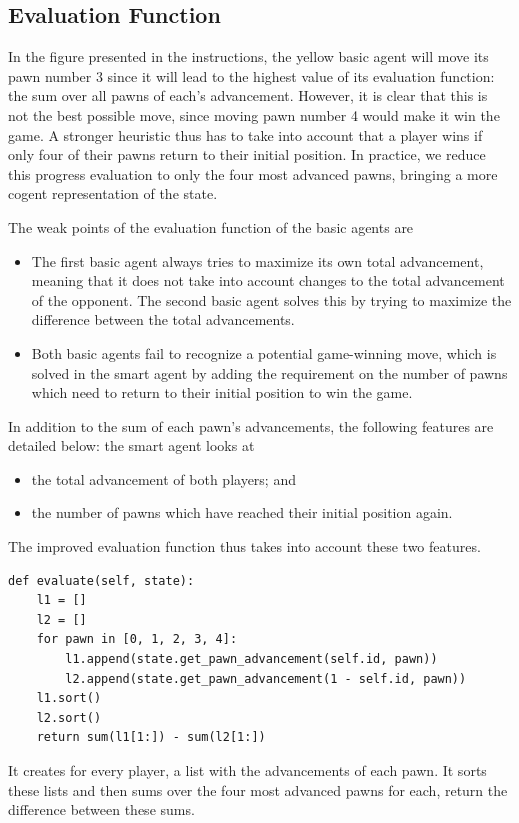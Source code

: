 \documentclass[journal,onecolumn]{IEEEtran}
\begin{document}
\subsection{Evaluation Function}
In the figure presented in the instructions, the yellow basic agent will move its pawn number 3 since it will lead to the highest value of its evaluation function: the sum over all pawns of each's advancement.
However, it is clear that this is not the best possible move, since moving pawn number 4 would make it win the game.
A stronger heuristic thus has to take into account that a player wins if only four of their pawns return to their initial position.
In practice, we reduce this progress evaluation to only the four most advanced pawns, bringing a more cogent representation of the state.

The weak points of the evaluation function of the basic agents are
\begin{itemize}
	\item The first basic agent always tries to maximize its own total advancement, meaning that it does not take into account changes to the total advancement of the opponent.
	The second basic agent solves this by trying to maximize the difference between the total advancements.
	\item Both basic agents fail to recognize a potential game-winning move, which is solved in the smart agent by adding the requirement on the number of pawns which need to return to their initial position to win the game.
\end{itemize}

In addition to the sum of each pawn’s advancements, the following features are detailed below: the smart agent looks at
\begin{itemize}
 \item the total advancement of both players; and
 \item the number of pawns which have reached their initial position again.
\end{itemize}

The improved evaluation function thus takes into account these two features.
\begin{verbatim}
def evaluate(self, state):
    l1 = []
    l2 = []
    for pawn in [0, 1, 2, 3, 4]:
        l1.append(state.get_pawn_advancement(self.id, pawn))
        l2.append(state.get_pawn_advancement(1 - self.id, pawn))
    l1.sort()
    l2.sort()
    return sum(l1[1:]) - sum(l2[1:])
\end{verbatim}
It creates for every player, a list with the advancements of each pawn.
It sorts these lists and then sums over the four most advanced pawns for each, return the difference between these sums.
\end{document}
